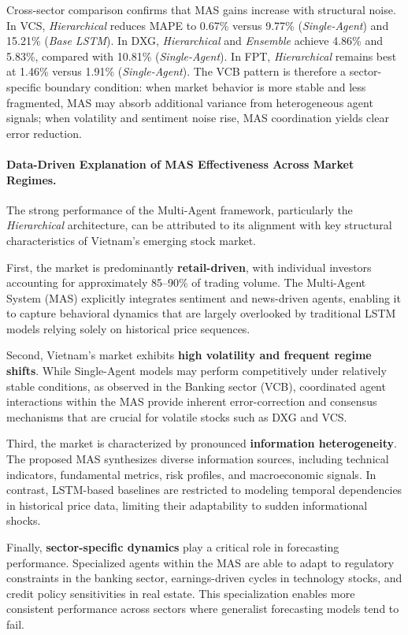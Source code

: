 \documentclass{ieeeaccess}
\begin{document}
Cross-sector comparison confirms that MAS gains increase with structural noise. In VCS, \textit{Hierarchical} reduces MAPE to 0.67\% versus 9.77\% (\textit{Single-Agent}) and 15.21\% (\textit{Base LSTM}). In DXG, \textit{Hierarchical} and \textit{Ensemble} achieve 4.86\% and 5.83\%, compared with 10.81\% (\textit{Single-Agent}). In FPT, \textit{Hierarchical} remains best at 1.46\% versus 1.91\% (\textit{Single-Agent}). The VCB pattern is therefore a sector-specific boundary condition: when market behavior is more stable and less fragmented, MAS may absorb additional variance from heterogeneous agent signals; when volatility and sentiment noise rise, MAS coordination yields clear error reduction.



\paragraph{Data-Driven Explanation of MAS Effectiveness Across Market Regimes.}
The strong performance of the Multi-Agent framework, particularly the \textit{Hierarchical} architecture, can be attributed to its alignment with key structural characteristics of Vietnam’s emerging stock market. 

First, the market is predominantly \textbf{retail-driven}, with individual investors accounting for approximately 85--90\% of trading volume. The Multi-Agent System (MAS) explicitly integrates sentiment and news-driven agents, enabling it to capture behavioral dynamics that are largely overlooked by traditional LSTM models relying solely on historical price sequences. 

Second, Vietnam’s market exhibits \textbf{high volatility and frequent regime shifts}. While Single-Agent models may perform competitively under relatively stable conditions, as observed in the Banking sector (VCB), coordinated agent interactions within the MAS provide inherent error-correction and consensus mechanisms that are crucial for volatile stocks such as DXG and VCS. 

Third, the market is characterized by pronounced \textbf{information heterogeneity}. The proposed MAS synthesizes diverse information sources, including technical indicators, fundamental metrics, risk profiles, and macroeconomic signals. In contrast, LSTM-based baselines are restricted to modeling temporal dependencies in historical price data, limiting their adaptability to sudden informational shocks. 

Finally, \textbf{sector-specific dynamics} play a critical role in forecasting performance. Specialized agents within the MAS are able to adapt to regulatory constraints in the banking sector, earnings-driven cycles in technology stocks, and credit policy sensitivities in real estate. This specialization enables more consistent performance across sectors where generalist forecasting models tend to fail.
\end{document}
